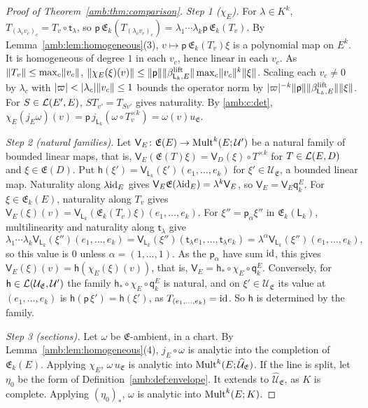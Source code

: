 \begin{proof}[Proof of Theorem~\ref{amb:thm:comparison}]
\emph{Step 1 ($\chi_E$).} For $\lambda\in K^k$, $T_{(\lambda_cv_c)_c}=T_v\circ\mathsf t_\lambda$, so $\mathsf p\,\mathfrak E_k(T_{(\lambda_cv_c)_c})=\lambda_1\cdots\lambda_k\mathsf p\,\mathfrak E_k(T_v)$. By Lemma~\ref{amb:lem:homogeneous}(3), $v\mapsto\mathsf p\,\mathfrak E_k(T_v)\xi$ is a polynomial map on $E^k$. It is homogeneous of degree $1$ in each $v_c$, hence linear in each $v_c$. As $\lVert T_v\rVert\le\max_c\lVert v_c\rVert$, $\lVert \chi_E(\xi)(v)\rVert\le\lVert \mathsf p\rVert\lVert \beta^{\rm lift}_{\mathsf L_k,E}\rVert\max_c\lVert v_c\rVert^k\lVert \xi\rVert$. Scaling each $v_c\ne0$ by $\lambda_c$ with $\lvert \varpi\rvert<\lvert \lambda_c\rvert\lVert v_c\rVert\le1$ bounds the operator norm by $\lvert \varpi\rvert^{-k}\lVert \mathsf p\rVert\lVert \beta^{\rm lift}_{\mathsf L_k,E}\rVert\lVert \xi\rVert$. For $S\in\mathcal L(E',E)$, $ST_{v'}=T_{Sv'}$ gives naturality. By \eqref{amb:c:det}, $\chi_E(j_E\omega)(v)=\mathsf p\,j_{\mathsf L_k}(\omega\circ T_v^{\times k})=\omega(v)u_{\mathfrak E}$.

\emph{Step 2 (natural families).} Let $\mathsf V_E\colon\mathfrak E(E)\to\operatorname{Mult}^k(E;\mathcal U')$ be a natural family of bounded linear maps, that is, $\mathsf V_E(\mathfrak E(T)\xi)=\mathsf V_D(\xi)\circ T^{\times k}$ for $T\in\mathcal L(E,D)$ and $\xi\in\mathfrak E(D)$. Put $\mathsf h(\xi')=\mathsf V_{\mathsf L_k}(\xi')(e_1,\dots,e_k)$ for $\xi'\in\mathcal U_{\mathfrak E}$, a bounded linear map. Naturality along $\lambda\mathrm{id}_E$ gives $\mathsf V_E\mathfrak E(\lambda\mathrm{id}_E)=\lambda^k\mathsf V_E$, so $\mathsf V_E=\mathsf V_E\mathsf q_k^E$. For $\xi\in\mathfrak E_k(E)$, naturality along $T_v$ gives $\mathsf V_E(\xi)(v)=\mathsf V_{\mathsf L_k}(\mathfrak E_k(T_v)\xi)(e_1,\dots,e_k)$. For $\xi''=\mathsf p_\alpha\xi''$ in $\mathfrak E_k(\mathsf L_k)$, multilinearity and naturality along $\mathsf t_\lambda$ give
\[
 \lambda_1\cdots\lambda_k\mathsf V_{\mathsf L_k}(\xi'')(e_1,\dots,e_k)=\mathsf V_{\mathsf L_k}(\xi'')(\mathsf t_\lambda e_1,\dots,\mathsf t_\lambda e_k)=\lambda^\alpha\mathsf V_{\mathsf L_k}(\xi'')(e_1,\dots,e_k),
\]
so this value is $0$ unless $\alpha=(1,\dots,1)$. As the $\mathsf p_\alpha$ have sum $\mathrm{id}$, this gives $\mathsf V_E(\xi)(v)=\mathsf h(\chi_E(\xi)(v))$, that is, $\mathsf V_E=\mathsf h_*\circ\chi_E\circ\mathsf q_k^E$. Conversely, for $\mathsf h\in\mathcal L(\mathcal U_{\mathfrak E},\mathcal U')$ the family $\mathsf h_*\circ\chi_E\circ\mathsf q_k^E$ is natural, and on $\xi'\in\mathcal U_{\mathfrak E}$ its value at $(e_1,\dots,e_k)$ is $\mathsf h(\mathsf p\,\xi')=\mathsf h(\xi')$, as $T_{(e_1,\dots,e_k)}=\mathrm{id}$. So $\mathsf h$ is determined by the family.

\emph{Step 3 (sections).} Let $\omega$ be $\mathfrak E$-ambient, in a chart. By Lemma~\ref{amb:lem:homogeneous}(4), $j_E\circ\omega$ is analytic into the completion of $\mathfrak E_k(E)$. Applying $\chi_E$, $\omega\,u_{\mathfrak E}$ is analytic into $\operatorname{Mult}^k(E;\widehat{\mathcal U}_{\mathfrak E})$. If the line is split, let $\eta_0$ be the form of Definition~\ref{amb:def:envelope}. It extends to $\widehat{\mathcal U}_{\mathfrak E}$, as $K$ is complete. Applying $(\eta_0)_*$, $\omega$ is analytic into $\operatorname{Mult}^k(E;K)$.
\end{proof}

